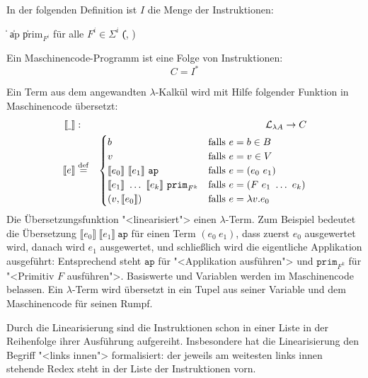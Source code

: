 \begin{definition}[Maschinencode]\label{def:secd-code}
  In der folgenden Definition ist $I$ die Menge der Instruktionen:
  \begin{grammar}
     \: 
    \> \| 
    \> \| ap
    \> \| prim$_{F^i}$ \textrm{für alle $F^i \in \Sigma^i$}
    \> \| (, )
  \end{grammar}
  Ein Maschinencode-Programm ist eine Folge von Instruktionen:
  \begin{displaymath}
    C = I^\ast
  \end{displaymath}
\end{definition}

Ein Term aus dem angewandten $\lambda$-Kalkül wird mit Hilfe folgender
Funktion in Maschinencode übersetzt:
%
\begin{eqnarray*}
  \llbracket \underline{~} \rrbracket &:& \mathcal{L}_{\lambda{}A}
  \rightarrow C\\
  \llbracket e \rrbracket &\stackrel{\rm def}{=}&
  \begin{cases}
    b & \textrm{falls $e = b \in B$}\\
    v & \textrm{falls $e = v \in V$}\\
    \llbracket e_0\rrbracket~\llbracket e_1\rrbracket~\mathtt{ap}
    & \textrm{falls $e = (e_0~e_1)$}\\
    \llbracket e_1\rrbracket~\ldots~\llbracket e_k\rrbracket~\mathtt{prim}_{F^k}
    & \textrm{falls $e = (F~e_1~\ldots~e_k)$}\\
    (v, \llbracket e_0\rrbracket) & \textrm{falls $e = \lambda v.e_0$}
  \end{cases}
\end{eqnarray*}
%
Die Übersetzungsfunktion "<linearisiert"> einen $\lambda$-Term.  Zum
Beispiel bedeutet die Übersetzung $\llbracket e_0\rrbracket~\llbracket
e_1\rrbracket~\mathtt{ap}$ für einen Term $(e_0~e_1)$, dass zuerst
$e_0$ ausgewertet wird, danach wird $e_1$ ausgewertet, und schließlich wird die
eigentliche Applikation ausgeführt:  Entsprechend steht $\mathtt{ap}$
für "<Applikation ausführen"> und $\mathtt{prim}_{F^k}$ für "<Primitiv
$F$ ausführen">.  Basiswerte und Variablen werden im Maschinencode
belassen.  Ein $\lambda$-Term wird übersetzt in ein Tupel aus seiner
Variable und dem Maschinencode für seinen Rumpf.

Durch die Linearisierung sind die Instruktionen schon in einer Liste in der
Reihenfolge ihrer Ausführung aufgereiht.  Insbesondere hat die
Linearisierung den Begriff "<links innen"> formalisiert: der jeweils
am weitesten links innen stehende Redex steht in der Liste der
Instruktionen vorn.

